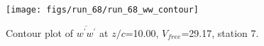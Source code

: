 \begin{figure}[H]
\centering
\texttt{[image: figs/run\_68/run\_68\_ww\_contour]}
\caption{Contour plot of $\overline{w^\prime w^\prime}$ at $z/c$=10.00, $V_{free}$=29.17, station 7.}
\label{fig:run_68_ww_contour}
\end{figure}


